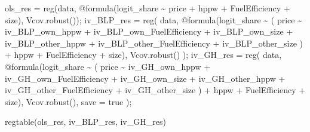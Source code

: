 \documentclass[
  letterpaper,
  DIV=11,
  numbers=noendperiod]{scrreprt}
\newenvironment{Shaded}{\begin{snugshade}}{\end{snugshade}}
\newcommand{\ConstantTok}[1]{\textcolor[rgb]{0.56,0.35,0.01}{#1}}
\newcommand{\FunctionTok}[1]{\textcolor[rgb]{0.28,0.35,0.67}{#1}}
\newcommand{\NormalTok}[1]{\textcolor[rgb]{0.00,0.23,0.31}{#1}}
\newcommand{\OperatorTok}[1]{\textcolor[rgb]{0.37,0.37,0.37}{#1}}
\newcommand{\PreprocessorTok}[1]{\textcolor[rgb]{0.68,0.00,0.00}{#1}}
\begin{document}
\begin{Shaded}
\begin{Highlighting}[]
\NormalTok{ols\_res }\OperatorTok{=} \FunctionTok{reg}\NormalTok{(data, }\PreprocessorTok{@formula}\NormalTok{(logit\_share }\OperatorTok{\textasciitilde{}}\NormalTok{ price }\OperatorTok{+}\NormalTok{ hppw }\OperatorTok{+}\NormalTok{ FuelEfficiency }\OperatorTok{+}\NormalTok{ size), Vcov.}\FunctionTok{robust}\NormalTok{());}
\NormalTok{iv\_BLP\_res }\OperatorTok{=} \FunctionTok{reg}\NormalTok{(}
\NormalTok{    data, }
    \PreprocessorTok{@formula}\NormalTok{(logit\_share }\OperatorTok{\textasciitilde{}}\NormalTok{ (}
\NormalTok{        price }\OperatorTok{\textasciitilde{}}\NormalTok{ iv\_BLP\_own\_hppw }\OperatorTok{+}\NormalTok{ iv\_BLP\_own\_FuelEfficiency }\OperatorTok{+}\NormalTok{ iv\_BLP\_own\_size }\OperatorTok{+} 
\NormalTok{            iv\_BLP\_other\_hppw }\OperatorTok{+}\NormalTok{ iv\_BLP\_other\_FuelEfficiency }\OperatorTok{+}\NormalTok{ iv\_BLP\_other\_size}
\NormalTok{    ) }\OperatorTok{+}\NormalTok{ hppw }\OperatorTok{+}\NormalTok{ FuelEfficiency }\OperatorTok{+}\NormalTok{ size),}
\NormalTok{    Vcov.}\FunctionTok{robust}\NormalTok{()}
\NormalTok{);}
\NormalTok{iv\_GH\_res }\OperatorTok{=} \FunctionTok{reg}\NormalTok{(}
\NormalTok{    data, }
    \PreprocessorTok{@formula}\NormalTok{(logit\_share }\OperatorTok{\textasciitilde{}}\NormalTok{ (}
\NormalTok{        price }\OperatorTok{\textasciitilde{}}\NormalTok{ iv\_GH\_own\_hppw }\OperatorTok{+}\NormalTok{ iv\_GH\_own\_FuelEfficiency }\OperatorTok{+}\NormalTok{ iv\_GH\_own\_size }\OperatorTok{+} 
\NormalTok{            iv\_GH\_other\_hppw }\OperatorTok{+}\NormalTok{ iv\_GH\_other\_FuelEfficiency }\OperatorTok{+}\NormalTok{ iv\_GH\_other\_size}
\NormalTok{    ) }\OperatorTok{+}\NormalTok{ hppw }\OperatorTok{+}\NormalTok{ FuelEfficiency }\OperatorTok{+}\NormalTok{ size),}
\NormalTok{    Vcov.}\FunctionTok{robust}\NormalTok{(),}
\NormalTok{    save }\OperatorTok{=} \ConstantTok{true}
\NormalTok{);}
\end{Highlighting}
\end{Shaded}

\begin{Shaded}
\begin{Highlighting}[]
\FunctionTok{regtable}\NormalTok{(ols\_res, iv\_BLP\_res, iv\_GH\_res)}
\end{Highlighting}
\end{Shaded}
\end{document}
